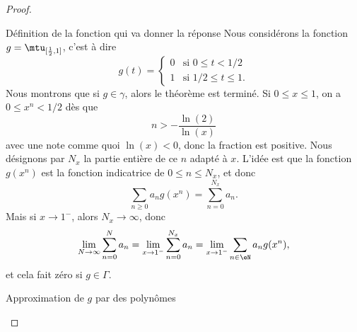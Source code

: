 \begin{proof}
\begin{subproof}
    \item[Définition de la fonction qui va donner la réponse]
        Nous considérons la fonction \( g=\mtu_{\mathopen[ \frac{ 1 }{2} , 1 \mathclose]}\), c'est à dire
        \begin{equation}
            g(t)=\begin{cases}
                0    &   \text{si } 0\leq t<1/2\\
                1    &    \text{si } 1/2\leq t\leq 1.
            \end{cases}
        \end{equation}
        Nous montrons que si \( g\in \gamma\), alors le théorème est terminé. Si \( 0\leq x\leq 1\), on a \( 0\leq x^n<1/2\) dès que
        \begin{equation}
            n>-\frac{ \ln(2) }{ \ln(x) }
        \end{equation}
        avec une note comme quoi \( \ln(x)<0\), donc la fraction est positive. Nous désignons par \( N_x\) la partie entière de ce \( n\) adapté à \( x\). L'idée est que la fonction  \( g(x^n)\) est la fonction indicatrice de \(0 \leq n\leq N_x\), et donc
        \begin{equation}
            \sum_{n\geq 0}a_ng(x^n)=\sum_{n=0}^{N_x}a_n.
        \end{equation}
        Mais si \( x\to 1^-\), alors \( N_x\to \infty\), donc
        \begin{equation}
            \lim_{N\to \infty} \sum_{n=0}^Na_n=\lim_{x\to 1^-} \sum_{n=0}^{N_x}a_n=\lim_{x\to 1^-} \sum_{n\in \eN}a_ng(x^n),
        \end{equation}
        et cela fait zéro si \( g\in \Gamma\).
        
    \item[Approximation de \( g\) par des polynômes]


\end{subproof}
\end{proof}
